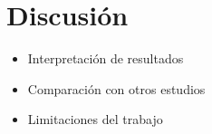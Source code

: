 \chapter{Discusión} 
\begin{itemize}
    \item Interpretación de resultados
    \item Comparación con otros estudios
    \item Limitaciones del trabajo
\end{itemize}